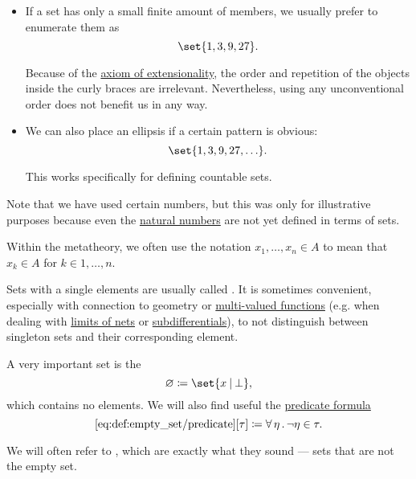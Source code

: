 \begin{definition}
\begin{itemize}
    \item If a set has only a small finite amount of members, we usually prefer to enumerate them as
    \begin{equation*}
      \set{ 1, 3, 9, 27 }.
    \end{equation*}

    Because of the \hyperref[def:naive_set_theory/extensionality]{axiom of extensionality}, the order and repetition of the objects inside the curly braces are irrelevant. Nevertheless, using any unconventional order does not benefit us in any way.

    \item We can also place an ellipsis if a certain pattern is obvious:
    \begin{equation*}
      \set{ 1, 3, 9, 27, \ldots }.
    \end{equation*}

    This works specifically for defining countable sets.
  \end{itemize}

  Note that we have used certain numbers, but this was only for illustrative purposes because even the \hyperref[def:natural_numbers]{natural numbers} are not yet defined in terms of sets.
\end{definition}

\begin{remark}\label{rem:multile_set_membership_shorthand}
  Within the metatheory, we often use the notation \( x_1, \ldots, x_n \in A \) to mean that \( x_k \in A \) for \( k \in 1, \ldots, n \).
\end{remark}

\begin{remark}\label{rem:singleton_sets}
  Sets with a single elements are usually called . It is sometimes convenient, especially with connection to geometry or \hyperref[def:multi_valued_function]{multi-valued functions} (e.g. when dealing with \hyperref[def:net_convergence/limit]{limits of nets} or \hyperref[def:subdifferentials]{subdifferentials}), to not distinguish between singleton sets and their corresponding element.
\end{remark}

\begin{definition}\label{def:empty_set}
  A very important set is the 
  \begin{equation*}
    \varnothing \coloneqq \set{ x \given \bot },
  \end{equation*}
  which contains no elements. We will also find useful the \hyperref[rem:predicate_formula]{predicate formula}
  \begin{equation*}\taglabel[\op{IsEmpty}]{eq:def:empty_set/predicate}
    \ref{eq:def:empty_set/predicate}[\tau] \coloneqq \qforall \eta \neg \eta \in \tau.
  \end{equation*}

  We will often refer to , which are exactly what they sound --- sets that are not the empty set.
\end{definition}

